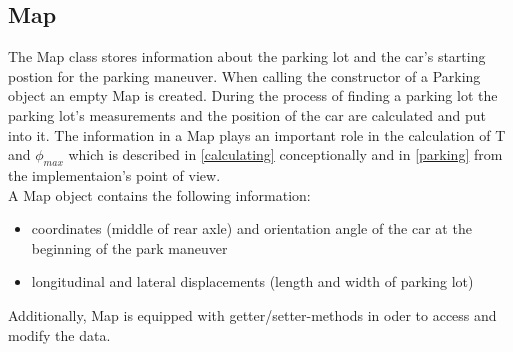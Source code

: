 \documentclass[paper=a4, fontsize=11pt]{scrreprt}
\begin{document}
\subsection{Map}
The Map class stores information about the parking lot and the car's starting postion for the parking maneuver. When calling the constructor of a Parking object an empty Map is created. During the process of finding a parking lot the parking lot's measurements and the position of the car are calculated and put into it. The information in a Map plays an important role in the calculation of T and $\phi_{max}$ which is described in \ref{calculating} conceptionally  and in \ref{parking} from the implementaion's point of view.\\
A Map object contains the following information:
\begin{itemize}
	\item coordinates (middle of rear axle) and orientation angle of the car at the beginning of the park maneuver
	\item longitudinal and lateral displacements (length and width of parking lot)
\end{itemize}
Additionally, Map is equipped with getter/setter-methods in oder to access and modify the data.
\end{document}
